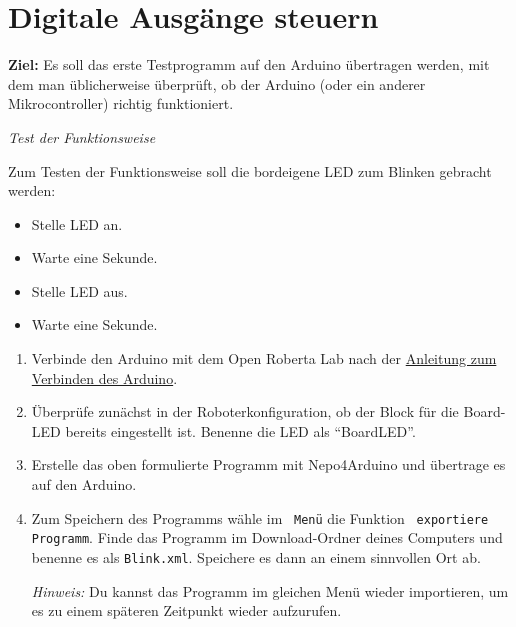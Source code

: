 \newpage
\section{Digitale Ausgänge steuern}

\begin{ziel}
	\textbf{Ziel:} Es soll das erste Testprogramm auf den Arduino übertragen werden, mit dem man üblicherweise überprüft, ob der Arduino (oder ein anderer Mikrocontroller) richtig funktioniert.
\end{ziel}

\begin{aufgabe} \emph{Test der Funktionsweise}
	
	Zum Testen der Funktionsweise soll die bordeigene LED zum Blinken gebracht werden:
	\begin{itemize}[itemsep=0ex]
		\item Stelle LED an.
		\item Warte eine Sekunde.
		\item Stelle LED aus.
		\item Warte eine Sekunde.
	\end{itemize}
	
	\begin{enumerate}[label= \alph*), itemsep=0ex, parsep=0ex]
		\item Verbinde den Arduino mit dem Open Roberta Lab nach der \href{https://jira.iais.fraunhofer.de/wiki/display/ORInfo/Vorbereitung+Nepo4Arduino}{Anleitung zum Verbinden des Arduino}.
		\item Überprüfe zunächst in der Roboterkonfiguration, ob der Block für die Board-LED bereits eingestellt ist. Benenne die LED als \enquote{BoardLED}.
		\item Erstelle das oben formulierte Programm mit Nepo4Arduino und übertrage es auf den Arduino.
		\item Zum Speichern des Programms wähle im ~\nepomenu\texttt{Menü} die Funktion ~\nepoexport\texttt{exportiere Programm}. Finde das Programm im Download-Ordner deines Computers und benenne es als \texttt{Blink.xml}. Speichere es dann an einem sinnvollen Ort ab.
		
		\emph{Hinweis:} Du kannst das Programm im gleichen Menü wieder importieren, um es zu einem späteren Zeitpunkt wieder aufzurufen.
	\end{enumerate}
\end{aufgabe}

